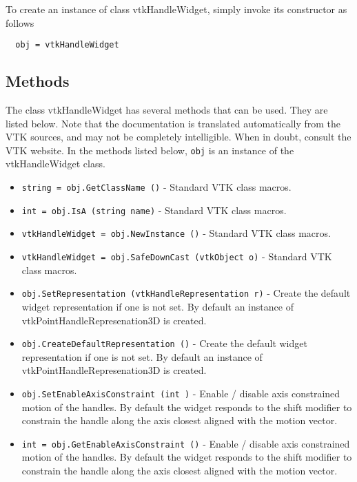 To create an instance of class vtkHandleWidget, simply
invoke its constructor as follows
\begin{verbatim}
  obj = vtkHandleWidget
\end{verbatim}
\subsection{Methods}

The class vtkHandleWidget has several methods that can be used.
  They are listed below.
Note that the documentation is translated automatically from the VTK sources,
and may not be completely intelligible.  When in doubt, consult the VTK website.
In the methods listed below, \verb|obj| is an instance of the vtkHandleWidget class.
\begin{itemize}
\item  \verb|string = obj.GetClassName ()| -  Standard VTK class macros.

\item  \verb|int = obj.IsA (string name)| -  Standard VTK class macros.

\item  \verb|vtkHandleWidget = obj.NewInstance ()| -  Standard VTK class macros.

\item  \verb|vtkHandleWidget = obj.SafeDownCast (vtkObject o)| -  Standard VTK class macros.

\item  \verb|obj.SetRepresentation (vtkHandleRepresentation r)| -  Create the default widget representation if one is not set. By default
 an instance of vtkPointHandleRepresenation3D is created.

\item  \verb|obj.CreateDefaultRepresentation ()| -  Create the default widget representation if one is not set. By default
 an instance of vtkPointHandleRepresenation3D is created.

\item  \verb|obj.SetEnableAxisConstraint (int )| -  Enable / disable axis constrained motion of the handles. By default the
 widget responds to the shift modifier to constrain the handle along the
 axis closest aligned with the motion vector.

\item  \verb|int = obj.GetEnableAxisConstraint ()| -  Enable / disable axis constrained motion of the handles. By default the
 widget responds to the shift modifier to constrain the handle along the
 axis closest aligned with the motion vector.


\end{itemize}
